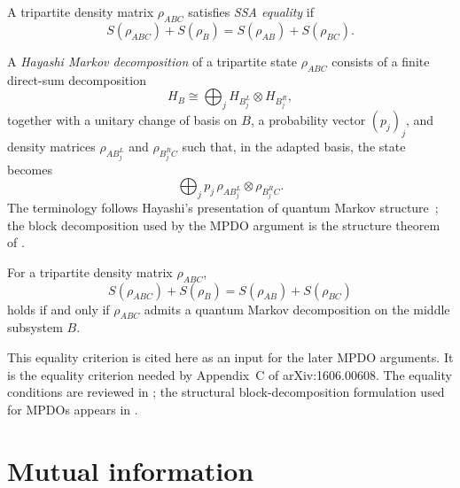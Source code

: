 \begin{definition}\label{def:ssa_equality}
    \leanok
    A tripartite density matrix $\rho_{ABC}$ satisfies
    \emph{SSA equality} if
    \[
        S(\rho_{ABC}) + S(\rho_B) = S(\rho_{AB}) + S(\rho_{BC}).
    \]
\end{definition}

\begin{definition}\label{def:hayashi_markov_decomposition}
    \leanok
    A \emph{Hayashi Markov decomposition} of a tripartite state $\rho_{ABC}$
    consists of a finite direct-sum decomposition
    \[
        H_B \cong \bigoplus_j H_{B_j^L} \otimes H_{B_j^R},
    \]
    together with a unitary change of basis on $B$, a probability vector
    $(p_j)_j$, and density matrices $\rho_{A B_j^L}$ and $\rho_{B_j^R C}$ such
    that, in the adapted basis, the state becomes
    \[
        \bigoplus_j p_j\, \rho_{A B_j^L} \otimes \rho_{B_j^R C}.
    \]
    The terminology follows Hayashi's presentation of quantum Markov
    structure~\cite{Hayashi2006QuantumInformation}; the block decomposition
    used by the MPDO argument is the structure theorem of
    \cite{Hayden2004Structure}.
\end{definition}

\begin{theorem}
    \label{thm:hayashi_ssa_equality_characterization}
    \notready
    For a tripartite density matrix $\rho_{ABC}$,
    \[
        S(\rho_{ABC}) + S(\rho_B) = S(\rho_{AB}) + S(\rho_{BC})
    \]
    holds if and only if $\rho_{ABC}$ admits a quantum Markov decomposition on
    the middle subsystem $B$.

    This equality criterion is cited here as an input for the later MPDO arguments.
    It is the equality criterion needed by Appendix~C of arXiv:1606.00608.
    The equality conditions are reviewed in
    \cite{Hayashi2006QuantumInformation, Ruskai2002Inequalities};
    the structural block-decomposition formulation used for MPDOs appears in
    \cite{Hayden2004Structure}.
\end{theorem}

\section{Mutual information}

